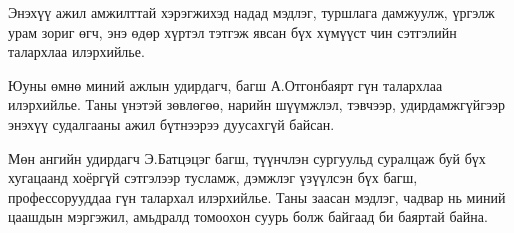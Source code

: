\begin{acknowledgements}
    \addchaptertocentry{\acknowledgementname}

    Энэхүү ажил амжилттай хэрэгжихэд надад мэдлэг, туршлага дамжуулж, үргэлж урам зориг өгч, энэ өдөр хүртэл тэтгэж явсан бүх хүмүүст чин сэтгэлийн талархлаа илэрхийлье.

    Юуны өмнө миний ажлын удирдагч, багш А.Отгонбаярт гүн талархлаа илэрхийлье. Таны үнэтэй зөвлөгөө, нарийн шүүмжлэл, тэвчээр, удирдамжгүйгээр энэхүү судалгааны ажил бүтнээрээ дуусахгүй байсан.

    Мөн ангийн удирдагч Э.Батцэцэг багш, түүнчлэн сургуульд суралцаж буй бүх хугацаанд хоёргүй сэтгэлээр тусламж, дэмжлэг үзүүлсэн бүх багш, профессорууддаа гүн талархал илэрхийлье. Таны заасан мэдлэг, чадвар нь миний цаашдын мэргэжил, амьдралд томоохон суурь болж байгаад би баяртай байна.

\end{acknowledgements}
